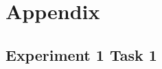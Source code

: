 \documentclass{article}
\begin{document}

\section*{Appendix}

\newpage
\subsection*{Experiment 1 Task 1}


\end{document}
